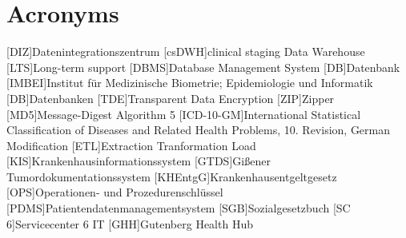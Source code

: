 \chapter*{Acronyms}
    \begin{acronym}[CDW]
    	[DIZ]{Datenintegrationszentrum}
    	[csDWH]{clinical staging Data Warehouse}
    	[LTS]{Long-term support}
    	[DBMS]{Database Management System}
    	[DB]{Datenbank}
    	[IMBEI]{Institut für Medizinische Biometrie; Epidemiologie und Informatik}
    	[DB]{Datenbanken}
    	[TDE]{Transparent Data Encryption}
    	[ZIP]{Zipper}
    	[MD5]{Message-Digest Algorithm 5}
    	[ICD-10-GM]{International Statistical Classification of Diseases and Related Health Problems, 10. Revision, German Modification}
    	[ETL]{Extraction Tranformation Load}
    	[KIS]{Krankenhausinformationssystem}
    	[GTDS]{Gißener Tumordokumentationssystem}
    	[KHEntgG]{Krankenhausentgeltgesetz}
    	[OPS]{Operationen- und Prozedurenschlüssel}
    	[PDMS]{Patientendatenmanagementsystem}
    	[SGB]{Sozialgesetzbuch}
    	[SC 6]{Servicecenter 6 IT}
    	[GHH]{Gutenberg Health Hub}
    \end{acronym}